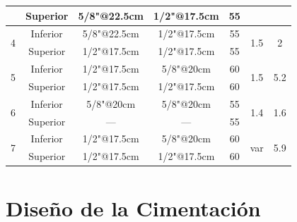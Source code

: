 \documentclass{article}%
\begin{document}
\begin{table}[h!]
{\begin{tabular}{|cc|cc|c|c|c|}
\multicolumn{1}{|c|}{}                     & Superior                     & \multicolumn{1}{c|}{5/8"@22.5cm}           & 1/2"@17.5cm           & 55                        &                         &                         \\ \hline
\multicolumn{1}{|c|}{\multirow{2}{*}{4}}   & Inferior                     & \multicolumn{1}{c|}{5/8"@22.5cm}           & 1/2"@17.5cm           & 55                        & \multirow{2}{*}{1.5}    & \multirow{2}{*}{2}      \\ \cline{2-5}
\multicolumn{1}{|c|}{}                     & Superior                     & \multicolumn{1}{c|}{1/2"@17.5cm}           & 1/2"@17.5cm           & 55                        &                         &                         \\ \hline
\multicolumn{1}{|c|}{\multirow{2}{*}{5}}   & Inferior                     & \multicolumn{1}{c|}{1/2"@17.5cm}           & 5/8"@20cm             & 60                        & \multirow{2}{*}{1.5}    & \multirow{2}{*}{5.2}    \\ \cline{2-5}
\multicolumn{1}{|c|}{}                     & Superior                     & \multicolumn{1}{c|}{1/2"@17.5cm}           & 1/2"@17.5cm           & 60                        &                         &                         \\ \hline
\multicolumn{1}{|c|}{\multirow{2}{*}{6}}   & Inferior                     & \multicolumn{1}{c|}{5/8"@20cm}             & 5/8"@20cm             & 55                        & \multirow{2}{*}{1.4}    & \multirow{2}{*}{1.6}    \\ \cline{2-5}
\multicolumn{1}{|c|}{}                     & Superior                     & \multicolumn{1}{c|}{---}                   & ---                   & 55                        &                         &                         \\ \hline
\multicolumn{1}{|c|}{\multirow{2}{*}{7}}   & Inferior                     & \multicolumn{1}{c|}{1/2"@17.5cm}           & 5/8"@20cm             & 60                        & \multirow{2}{*}{var}    & \multirow{2}{*}{5.9}    \\ \cline{2-5}
\multicolumn{1}{|c|}{}                     & Superior                     & \multicolumn{1}{c|}{1/2"@17.5cm}           & 1/2"@17.5cm           & 60                        &                         &                         \\ \hline
\end{tabular}
}
\end{table}
%
\section{Diseño de la Cimentación}%
\label{sec:DiseodelaCimentacin}%
\end{document}
